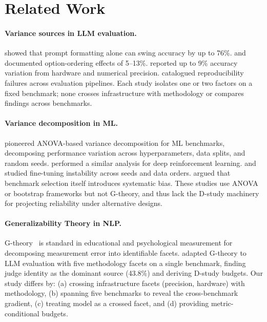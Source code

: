 \documentclass[11pt]{article}
\begin{document}
\section{Related Work}

\paragraph{Variance sources in LLM evaluation.}
\citet{sclar2024quantifying} showed that prompt formatting alone can swing accuracy by up to 76\%.
\citet{pezeshkpour2024large} and \citet{lu2022fantastically} documented option-ordering effects of 5--13\%.
\citet{yuan2025revisiting} reported up to 9\% accuracy variation from hardware and numerical precision.
\citet{biderman2024lessons} catalogued reproducibility failures across evaluation pipelines.
Each study isolates one or two factors on a fixed benchmark; none crosses infrastructure with methodology or compares findings across benchmarks.

\paragraph{Variance decomposition in ML.}
\citet{bouthillier2021accounting} pioneered ANOVA-based variance decomposition for ML benchmarks, decomposing performance variation across hyperparameters, data splits, and random seeds.
\citet{henderson2018deep} performed a similar analysis for deep reinforcement learning.
\citet{dodge2020finetuning} and \citet{sellam2022multibERTs} studied fine-tuning instability across seeds and data orders.
\citet{dehghani2021benchmark} argued that benchmark selection itself introduces systematic bias.
These studies use ANOVA or bootstrap frameworks but not G-theory, and thus lack the D-study machinery for projecting reliability under alternative designs.

\paragraph{Generalizability Theory in NLP.}
G-theory~\citep{brennan2001generalizability,shavelson1991generalizability} is standard in educational and psychological measurement for decomposing measurement error into identifiable facets.
\citet{mesting2026gtheory} adapted G-theory to LLM evaluation with five methodology facets on a single benchmark, finding judge identity as the dominant source (43.8\%) and deriving D-study budgets.
Our study differs by: (a) crossing infrastructure facets (precision, hardware) with methodology, (b) spanning five benchmarks to reveal the cross-benchmark gradient, (c) treating model as a crossed facet, and (d) providing metric-conditional budgets.
\end{document}
